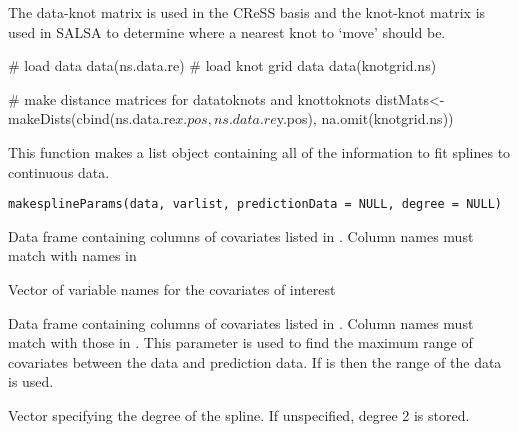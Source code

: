 \documentclass[a4paper]{book}
\begin{document}
%
\begin{Details}\relax
The data-knot matrix is used in the CReSS basis and the knot-knot matrix is used in SALSA to determine where a nearest knot to `move' should be.
\end{Details}
%
\begin{Examples}
\begin{ExampleCode}
# load data
data(ns.data.re)
# load knot grid data
data(knotgrid.ns)
 
# make distance matrices for datatoknots and knottoknots
distMats<-makeDists(cbind(ns.data.re$x.pos, ns.data.re$y.pos), na.omit(knotgrid.ns))
\end{ExampleCode}
\end{Examples}
%
\begin{Description}\relax
This function makes a list object containing all of the information to fit splines to continuous data.
\end{Description}
%
\begin{Usage}
\begin{verbatim}
makesplineParams(data, varlist, predictionData = NULL, degree = NULL)
\end{verbatim}
\end{Usage}
%
\begin{Arguments}
\begin{ldescription}
\item[\code{data}] Data frame containing columns of covariates listed in .  Column names must match with names in 

\item[\code{varlist}] Vector of variable names for the covariates of interest

\item[\code{predictionData}] Data frame containing columns of covariates listed in .  Column names must match with those in .  This parameter is used to find the maximum range of covariates between the data and prediction data. If  is  then the range of the data is used.

\item[\code{degree}] Vector specifying the degree of the spline. If unspecified, degree 2 is stored.
\end{ldescription}
\end{Arguments}
%
\end{document}
